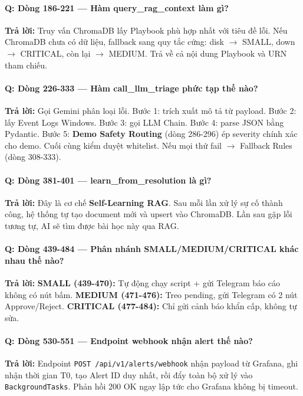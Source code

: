 \documentclass[12pt,a4paper]{article}
\begin{document}
\paragraph{Q: Dòng 186-221 — Hàm query\_rag\_context làm gì?}
\textbf{Trả lời:} Truy vấn ChromaDB lấy Playbook phù hợp nhất với tiêu đề lỗi. Nếu ChromaDB chưa có dữ liệu, fallback sang quy tắc cứng: disk $\rightarrow$ SMALL, down $\rightarrow$ CRITICAL, còn lại $\rightarrow$ MEDIUM. Trả về cả nội dung Playbook và URN tham chiếu.

\paragraph{Q: Dòng 226-333 — Hàm call\_llm\_triage phức tạp thế nào?}
\textbf{Trả lời:} Gọi Gemini phân loại lỗi. Bước 1: trích xuất mô tả từ payload. Bước 2: lấy Event Logs Windows. Bước 3: gọi LLM Chain. Bước 4: parse JSON bằng Pydantic. Bước 5: \textbf{Demo Safety Routing} (dòng 286-296) ép severity chính xác cho demo. Cuối cùng kiểm duyệt whitelist. Nếu mọi thứ fail $\rightarrow$ Fallback Rules (dòng 308-333).

\paragraph{Q: Dòng 381-401 — learn\_from\_resolution là gì?}
\textbf{Trả lời:} Đây là cơ chế \textbf{Self-Learning RAG}. Sau mỗi lần xử lý sự cố thành công, hệ thống tự tạo document mới và upsert vào ChromaDB. Lần sau gặp lỗi tương tự, AI sẽ tìm được bài học này qua RAG.

\paragraph{Q: Dòng 439-484 — Phân nhánh SMALL/MEDIUM/CRITICAL khác nhau thế nào?}
\textbf{Trả lời:} \textbf{SMALL (439-470):} Tự động chạy script + gửi Telegram báo cáo không có nút bấm. \textbf{MEDIUM (471-476):} Treo pending, gửi Telegram có 2 nút Approve/Reject. \textbf{CRITICAL (477-484):} Chỉ gửi cảnh báo khẩn cấp, không tự sửa.

\paragraph{Q: Dòng 530-551 — Endpoint webhook nhận alert thế nào?}
\textbf{Trả lời:} Endpoint \texttt{POST /api/v1/alerts/webhook} nhận payload từ Grafana, ghi nhận thời gian T0, tạo Alert ID duy nhất, rồi đẩy toàn bộ xử lý vào \texttt{BackgroundTasks}. Phản hồi 200 OK ngay lập tức cho Grafana không bị timeout.
\end{document}
